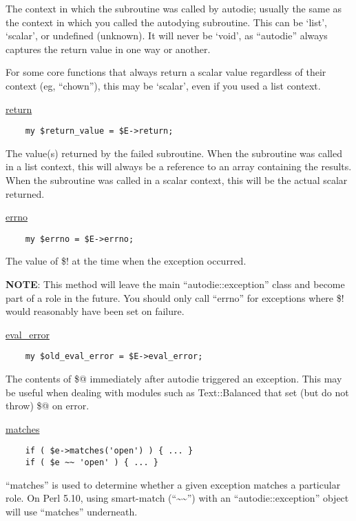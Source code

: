 \documentclass[]{article}
\let\realtextbf=\textbf
\renewcommand{\textbf}[1]{\textcolor{boldcolor}{\realtextbf{#1}}}
\renewcommand{\emph}[1]{\underline{#1}}
\begin{document}
The context in which the subroutine was called by autodie; usually the
same as the context in which you called the autodying subroutine. This
can be `list', `scalar', or undefined (unknown). It will never be
`void', as ``autodie'' always captures the return value in one way or
another.

For some core functions that always return a scalar value regardless of
their context (eg, ``chown''), this may be `scalar', even if you used a
list context.

\emph{return}

\begin{verbatim}
    my $return_value = $E->return;
\end{verbatim}

The value(s) returned by the failed subroutine. When the subroutine was
called in a list context, this will always be a reference to an array
containing the results. When the subroutine was called in a scalar
context, this will be the actual scalar returned.

\emph{errno}

\begin{verbatim}
    my $errno = $E->errno;
\end{verbatim}

The value of \$! at the time when the exception occurred.

\textbf{NOTE}: This method will leave the main ``autodie::exception''
class and become part of a role in the future. You should only call
``errno'' for exceptions where \$! would reasonably have been set on
failure.

\emph{eval\_error}

\begin{verbatim}
    my $old_eval_error = $E->eval_error;
\end{verbatim}

The contents of \$@ immediately after autodie triggered an exception.
This may be useful when dealing with modules such as Text::Balanced that
set (but do not throw) \$@ on error.

\emph{matches}

\begin{verbatim}
    if ( $e->matches('open') ) { ... }
    if ( $e ~~ 'open' ) { ... }
\end{verbatim}

``matches'' is used to determine whether a given exception matches a
particular role. On Perl 5.10, using smart-match
(``\textasciitilde{}\textasciitilde{}'') with an ``autodie::exception''
object will use ``matches'' underneath.
\end{document}

